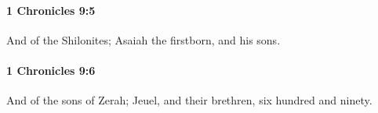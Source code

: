 		\paragraph{1 Chronicles 9:5} %
			\label{1CHRONICLES-9-5}

			And of the Shilonites; Asaiah the firstborn, and his sons.


		\paragraph{1 Chronicles 9:6} %
			\label{1CHRONICLES-9-6}

			And of the sons of Zerah; Jeuel, and their brethren, six hundred and ninety.


